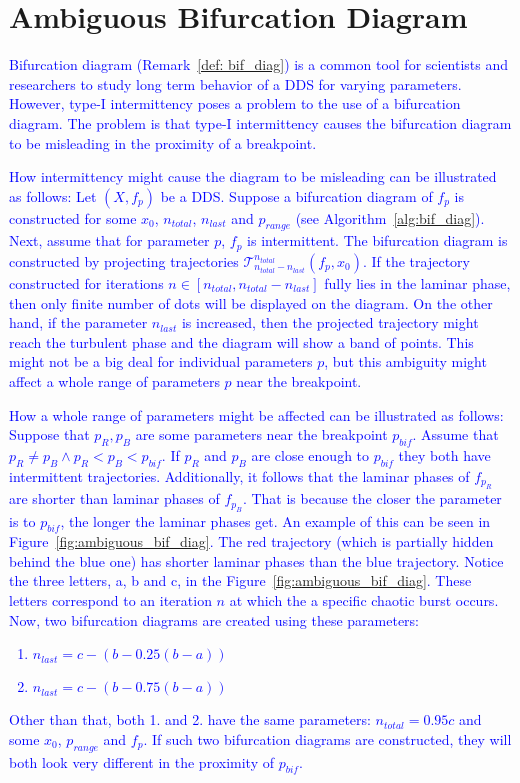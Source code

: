 \section{Ambiguous Bifurcation Diagram}
\label{sec:ambiguous_bif_diag}
\textcolor{blue}{
Bifurcation diagram (Remark~\ref{def: bif_diag}) is a common tool for scientists and researchers to study long term behavior of a DDS for varying parameters.
However, type-I intermittency poses a problem to the use of a bifurcation diagram.
The problem is that type-I intermittency causes the bifurcation diagram to be misleading in the proximity of a breakpoint.
}
\par
\textcolor{blue}{
How intermittency might cause the diagram to be misleading can be illustrated as follows:
Let $(X, f_{p})$ be a DDS.
Suppose a bifurcation diagram of $f_{p}$ is constructed for some $x_0$, $n_{total}$, $n_{last}$ and $p_{range}$ (see Algorithm~\ref{alg:bif_diag}).
Next, assume that for parameter $p$, $f_{p}$ is intermittent.
The bifurcation diagram is constructed by projecting trajectories $\mathcal{T}_{n_{total}-n_{last}}^{n_{total}}(f_{p}, x_0)$.
If the trajectory constructed for iterations $n \in [n_{total}, n_{total}-n_{last}]$ fully lies in the laminar phase, then only finite number of dots will be displayed on the diagram.
On the other hand, if the parameter $n_{last}$ is increased, then the projected trajectory might reach the turbulent phase and the diagram will show a band of points.
This might not be a big deal for individual parameters $p$, but this ambiguity might affect a whole range of parameters $p$ near the breakpoint.
}
\par
\textcolor{blue}{
How a whole range of parameters might be affected can be illustrated as follows:
Suppose that $p_{R}, p_{B}$ are some parameters near the breakpoint $p_{bif}$.
Assume that $p_{R} \neq p_{B} \wedge p_{R} < p_{B} < p_{bif}$.
If $p_{R}$ and $p_{B}$ are close enough to $p_{bif}$ they both have intermittent trajectories.
Additionally, it follows that the laminar phases of $f_{p_{R}}$ are shorter than laminar phases of $f_{p_{B}}$.
That is because the closer the parameter is to $p_{bif}$, the longer the laminar phases get.
An example of this can be seen in Figure~\ref{fig:ambiguous_bif_diag}.
The red trajectory (which is partially hidden behind the blue one) has shorter laminar phases than the blue trajectory.
Notice the three letters, a, b and c, in the Figure~\ref{fig:ambiguous_bif_diag}.
These letters correspond to an iteration $n$ at which the a specific chaotic burst occurs.
Now, two bifurcation diagrams are created using these parameters:
\begin{enumerate}
    \item $n_{last} = c-(b-0.25(b-a))$
    \item $n_{last} = c-(b-0.75(b-a))$
\end{enumerate}
Other than that, both 1. and 2. have the same parameters: $n_{total} = 0.95c$ and some $x_0$, $p_{range}$ and $f_{p}$.
If such two bifurcation diagrams are constructed, they will both look very different in the proximity of $p_{bif}$.
}

